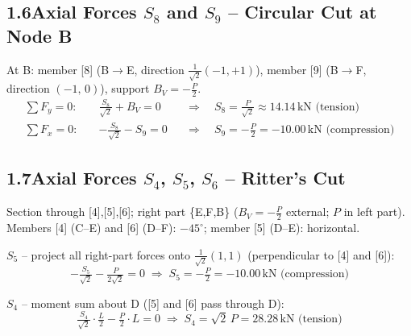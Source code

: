\documentclass[a4paper,11pt]{article}
\begin{document}
\begin{center}
\end{center}


\subsection*{1.6\quad Axial Forces $S_8$ and $S_9$ -- Circular Cut at Node B}

At B: member [8] (B$\to$E, direction $\tfrac{1}{\sqrt{2}}(-1,+1)$),
member [9] (B$\to$F, direction $(-1,\,0)$), support $B_V = -\tfrac{P}{2}$.
\begin{align*}
  \sum F_y = 0:\quad & \tfrac{S_8}{\sqrt{2}} + B_V = 0
    &&\Rightarrow\quad \boxed{S_8 = \tfrac{P}{\sqrt{2}} \approx 14.14\,\text{kN (tension)}} \\
  \sum F_x = 0:\quad & -\tfrac{S_8}{\sqrt{2}} - S_9 = 0
    &&\Rightarrow\quad \boxed{S_9 = -\tfrac{P}{2} = -10.00\,\text{kN (compression)}}
\end{align*}

\subsection*{1.7\quad Axial Forces $S_4$, $S_5$, $S_6$ -- Ritter's Cut}

Section through [4],[5],[6]; right part \{E,F,B\} ($B_V = -\tfrac{P}{2}$ external; $P$ in left part).
Members [4] (C--E) and [6] (D--F): $-45^\circ$; member [5] (D--E): horizontal.

\textbf{$S_5$} -- project all right-part forces onto $\tfrac{1}{\sqrt{2}}(1,1)$
(perpendicular to [4] and [6]):
\[
  -\tfrac{S_5}{\sqrt{2}} - \tfrac{P}{2\sqrt{2}} = 0
  \;\Rightarrow\; \boxed{S_5 = -\tfrac{P}{2} = -10.00\,\text{kN (compression)}}
\]

\textbf{$S_4$} -- moment sum about D ([5] and [6] pass through D):
\[
  \tfrac{S_4}{\sqrt{2}}\cdot\tfrac{L}{2} - \tfrac{P}{2}\cdot L = 0
  \;\Rightarrow\; \boxed{S_4 = \sqrt{2}\,P = 28.28\,\text{kN (tension)}}
\]
\end{document}
